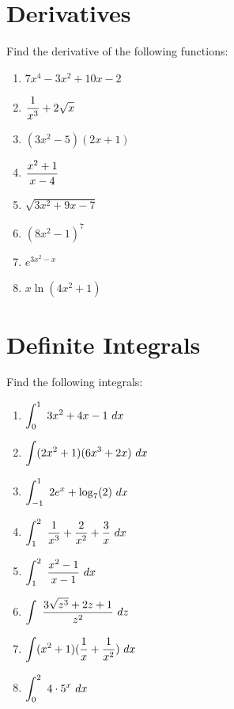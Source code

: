 \documentclass[10pt]{article}
\begin{document}
\pagestyle{otherpages}
\thispagestyle{firstpage}

\section{Derivatives}
Find the derivative of the following functions:
\begin{enumerate}
    \item $ 7x^4-3x^2+10x-2$
    \item $\displaystyle \frac{1}{x^3}+2\sqrt{x}$
    \item $(3x^2-5)(2x+1)$
    \item $\displaystyle \frac{x^2+1}{x-4}$
    \item $\sqrt{3x^2+9x-7}$
    \item $(8x^2-1)^7$
    \item $ e^{3x^2-x}$
    \item $x\ln(4x^2+1)$
    
\end{enumerate}
\newpage
\section{Definite Integrals}
Find the following integrals:
\begin{enumerate}
    \item $\ds \int_0^1\ 3x^2+4x-1\ dx$
    \item $\ds \int  (2x^2+1)(6x^3+2x)\ dx$
    \item $\ds \int_{-1}^1\ 2e^x+\log_7(2)\ dx$
    \item $\ds \int_1^2\ \frac{1}{x^3}+\frac{2}{x^2}+\frac{3}{x}\ dx$
    \item $\ds \int_1^2\ \frac{x^2-1}{x-1}\ dx$
    \item $\ds \int \ \frac{3\sqrt{z^3}+2z+1}{z^2}\ dz$
    \item $\displaystyle \int (x^2+1)(\frac{1}{x}+\frac{1}{x^2})\ dx$
    \item $\ds\int_0^2\ 4\cdot5^x\ dx$
    
\end{enumerate}

\newpage
\end{document}
